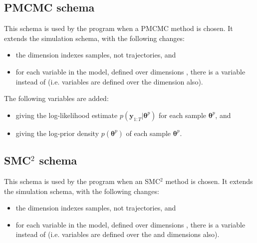 \subsection{PMCMC schema}

This schema is used by the  program when a PMCMC method is
chosen. It extends the simulation schema, with the following changes:
\begin{itemize}
\item the  dimension indexes samples, not trajectories, and
\item for each  variable  in the model,
  defined over dimensions , there is a variable
   instead of
   (i.e.  variables are
  defined over the  dimension also).
\end{itemize}
The following variables are added:
\begin{itemize}
\item {} giving the log-likelihood estimate
  $p(\mathbf{y}_{1:T}|\boldsymbol{\theta}^p)$ for each sample
  $\boldsymbol{\theta}^p$, and
\item {} giving the log-prior density
  $p(\boldsymbol{\theta}^p)$ of each sample $\boldsymbol{\theta}^p$.
\end{itemize}

\subsection{SMC$^2$ schema}

This schema is used by the  program when an SMC$^2$ method
is chosen. It extends the simulation schema, with the following changes:
\begin{itemize}
\item the  dimension indexes samples, not trajectories, and
\item for each  variable  in the model,
  defined over dimensions , there is a variable
   instead of
   (i.e.  variables are
  defined over the  and  dimensions also).
\end{itemize}

